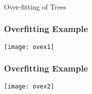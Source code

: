 %
%
%
%

\begin{frame}[fragile]\frametitle{}
\begin{center}
{\Large Over-fitting of Trees}
\end{center}
\end{frame}

\begin{frame}[fragile]\frametitle{Overfitting Example}
\begin{center}
\texttt{[image: ovex1]}
\end{center}
\end{frame}

\begin{frame}[fragile]\frametitle{Overfitting Example}
\begin{center}
\texttt{[image: ovex2]}
\end{center}
\end{frame}


